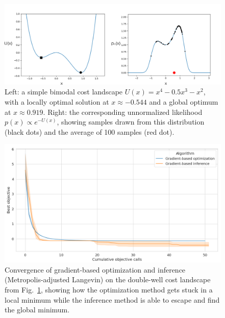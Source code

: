 \begin{figure}[tb]
    \centering
    \includegraphics[width=0.6\linewidth]{images/global_methods/sampling_as_optimization.png}
    \caption{Left: a simple bimodal cost landscape $U(x) = x^4 - 0.5 x^3 - x^2$, with a locally optimal solution at $x\approx -0.544$ and a global optimum at $x\approx 0.919$. Right: the corresponding unnormalized likelihood $p(x) \propto e^{-U(x)}$, showing samples drawn from this distribution (black dots) and the average of 100 samples (red dot).}
    \label{global:fig:toy_example}
\end{figure}

\begin{figure}[tb]
    \centering
    \includegraphics[width=0.6\linewidth]{images/global_methods/double_well_gd_mala.png}
    \caption{Convergence of gradient-based optimization and inference (Metropolis-adjusted Langevin) on the double-well cost landscape from Fig.~\ref{global:fig:toy_example}, showing how the optimization method gets stuck in a local minimum while the inference method is able to escape and find the global minimum.}
    \label{global:fig:toy_example_convergence}
\end{figure}

